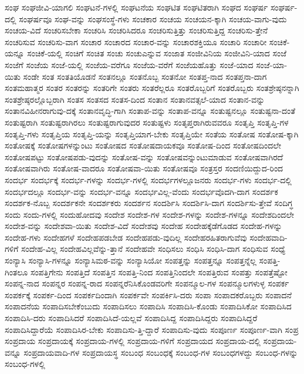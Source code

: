 {ಸಂಘ
ಸಂಘಜೀವಿ-ಯಾಗಲಿ
ಸಂಘಟನೆ-ಗಳಲ್ಲಿ
ಸಂಘಟನೆಯ
ಸಂಘಟಿತ
ಸಂಘಟಿತರಾಗಿ
ಸಂಘದ
ಸಂಘರ್ಷ
ಸಂಘರ್ಷ-ದಲ್ಲಿ
ಸಂಘರ್ಷವೂ
ಸಂಘ-ವನ್ನು
ಸಂಘಸಂಸ್ಥೆ-ಗಳು
ಸಂಚಕಾರ
ಸಂಚಯ
ಸಂಚಯನ-ಕ್ಕಾಗಿ
ಸಂಚಯ-ವಾಗು-ವುದು
ಸಂಚಯ-ವಿದೆ
ಸಂಚರಿಸಬೇಕಾ
ಸಂಚರಿಸಿ
ಸಂಚರಿಸಿದರೂ
ಸಂಚರಿಸುತ್ತಿತ್ತು
ಸಂಚರಿಸುತ್ತಿದ್ದ
ಸಂಚರಿಸು-ತ್ತೇನೆ
ಸಂಚರಿಸುವ
ಸಂಚರಿಸು-ವಾಗ
ಸಂಚಾರ
ಸಂಚಾರದ
ಸಂಚಾರ-ವನ್ನು
ಸಂಚಾರಶಕ್ತಿಯೂ
ಸಂಚಾರಿ
ಸಂಚಾರೀ
ಸಂಚಿಕೆ-ಯನ್ನೂ
ಸಂಚಿಕೆ-ಯಲ್ಲಿ
ಸಂಚಿಗೆ
ಸಂಚಿತ
ಸಂಚು
ಸಂಚುಎನ್ನುವ
ಸಂಜಾತ
ಸಂಜೀವಿನಿಯ
ಸಂಜೀವಿನಿ-ಯಾದ
ಸಂಜೆ
ಸಂಜೆಗೆ
ಸಂಜೆಯ
ಸಂಜೆ-ಯಲ್ಲಿ
ಸಂಜೆಯ-ವರೆಗೂ
ಸಂಜೆಯ-ವರೆಗೆ
ಸಂಜೆಯಹೊತ್ತು
ಸಂಜೆ-ಯಾದ
ಸಂಜೆ-ಯಾ-ಯಿತು
ಸಂಡೇ
ಸಂತ
ಸಂತತಿಯೊಡನೆ
ಸಂತನಲ್ಲೂ
ಸಂತನೊಬ್ಬ
ಸಂತನೋ
ಸಂತಪ್ತ-ನಾದ
ಸಂತಪ್ತನಾ-ದಾಗ
ಸಂತಮಹಾತ್ಮರ
ಸಂತರ
ಸಂತರನ್ನು
ಸಂತರಿಗೇ
ಸಂತರು
ಸಂತರೆಲ್ಲರೂ
ಸಂತರೊಬ್ಬರಿಗೆ
ಸಂತರೊಬ್ಬರು
ಸಂತಶ್ರೇಷ್ಠನನ್ನಾಗಿ
ಸಂತಶ್ರೇಷ್ಠರಲ್ಲೊಬ್ಬರಾಗಿ
ಸಂತಸ
ಸಂತಸದ
ಸಂತಸ-ದಿಂದ
ಸಂತಾನ
ಸಂತಾನವತ್ಸಲೆ-ಯಾದ
ಸಂತಾನ-ವನ್ನು
ಸಂತಾನವಿಹೀನರಾಗುವು-ದಕ್ಕೆ
ಸಂತಾನವೃದ್ಧಿ-ಗಾಗಿ
ಸಂತಾಪ-ವನ್ನು
ಸಂತಾಪ-ವನ್ನೂ
ಸಂತುಷ್ಟನಲ್ಲೂ
ಸಂತುಷ್ಟನಾ-ದಂತೆ
ಸಂತುಷ್ಟರಾಗಿ
ಸಂತುಷ್ಟರಾಗಿರಲು
ಸಂತುಷ್ಟರಾಗುವುದರ
ಸಂತುಷ್ಟಳು
ಸಂತೃಪ್ತರಾಗಿರುವವರೂ
ಸಂತೃಪ್ತಿ
ಸಂತೃಪ್ತಿ-ಗಳ
ಸಂತೃಪ್ತಿ-ಗಳು
ಸಂತೃಪ್ತಿಯ
ಸಂತೃಪ್ತಿ-ಯನ್ನು
ಸಂತೃಪ್ತಿಯಾಗ-ಬೇಕು
ಸಂತೃಪ್ತಿಯೇ
ಸಂತೆಯ
ಸಂತೋಷ
ಸಂತೋಷ-ಕ್ಕಾಗಿ
ಸಂತೋಷಕ್ಕೆ
ಸಂತೋಷಗಳನ್ನುಂಟು
ಸಂತೋಷದ
ಸಂತೋಷದಾಯಕವೂ
ಸಂತೋಷ-ದಿಂದ
ಸಂತೋಷದಿಂದಲೇ
ಸಂತೋಷಪಟ್ಟು
ಸಂತೋಷಪಡು-ವುದನ್ನು
ಸಂತೋಷ-ವನ್ನು
ಸಂತೋಷವನ್ನುಂಟುಮಾಡುವ
ಸಂತೋಷವಾಗಿರದೆ
ಸಂತೋಷವಾಗಿರು
ಸಂತೋಷ-ವಾದರೂ
ಸಂತೋಷವಾ-ಯಿತು
ಸಂತೋಷವೂ
ಸಂತ್ರಸ್ತರ
ಸಂದಣಿಯಿದ್ದುದ-ರಿಂದ
ಸಂದರ್ಭ
ಸಂದರ್ಭಕ್ಕೆ
ಸಂದರ್ಭ-ಗಳನ್ನು
ಸಂದರ್ಭ-ಗಳಲ್ಲಿ
ಸಂದರ್ಭಗಳಲ್ಲೂಜನರು
ಸಂದರ್ಭ-ಗಳು
ಸಂದರ್ಭ-ದಲ್ಲಿ
ಸಂದರ್ಭದಲ್ಲೂ
ಸಂದರ್ಭ-ವನ್ನು
ಸಂದರ್ಭ-ವನ್ನೂ
ಸಂದರ್ಭವಿಲ್ಲ-ವೆಂದು
ಸಂದರ್ಭವೊದಗಿ-ದಾಗ
ಸಂದರ್ಶಕ
ಸಂದರ್ಶಕ-ನೊಬ್ಬ
ಸಂದರ್ಶಕನೇ
ಸಂದರ್ಶಕರು
ಸಂದರ್ಶನ
ಸಂದರ್ಶಿಸಿ
ಸಂದರ್ಶಿಸಿ-ದಾಗ
ಸಂದರ್ಶಿಸು-ತ್ತೇವೆ
ಸಂದಿಗ್ಧ
ಸಂದು
ಸಂದು-ಗಳಲ್ಲಿ
ಸಂದುಹೋದವು
ಸಂದೇಶ
ಸಂದೇಶ-ಗಳ
ಸಂದೇಶ-ಗಳನ್ನು
ಸಂದೇಶ-ಗಳನ್ನೂ
ಸಂದೇಶದಿಂದಲೇ
ಸಂದೇಶ-ವನ್ನು
ಸಂದೇಶವಾ-ಯಿತು
ಸಂದೇಶ-ವಿದೆ
ಸಂದೇಶವು
ಸಂದೇಹ
ಸಂದೇಹಕ್ಕೆಡೆಗೊಡದ
ಸಂದೇಹ-ಗಳನ್ನು
ಸಂದೇಹ-ಗಳು
ಸಂದೇಹಗಳೆ
ಸಂದೇಹಪಡಬೇಡ
ಸಂದೇಹಪಡು-ವುದಿಲ್ಲ
ಸಂದೇಹರಹಿತರಾಗುವೆವು
ಸಂದೇಹವಾದಿ-ಗಳಿಗೆ
ಸಂದೇಹ-ವಿಲ್ಲ
ಸಂದೇಹವಿಲ್ಲವೆನ್ನು-ತ್ತಾನೆ
ಸಂದೇಹವೇ
ಸಂಧಿಸಲು
ಸಂಧಿಸಿ
ಸಂಧಿಸಿ-ದಾಗ
ಸಂಧಿಸುವ
ಸಂಧ್ಯೆ
ಸಂನ್ಯಾಸಿ
ಸಂನ್ಯಾಸಿ-ಗಳನ್ನೂ
ಸಂನ್ಯಾಸಿಮಠ-ವನ್ನು
ಸಂನ್ಯಾಸಿಯೋ
ಸಂಪತ್ತನ್ನು
ಸಂಪತ್ತನ್ನೂ
ಸಂಪತ್ತನ್ನೆಲ್ಲ
ಸಂಪತ್ತಿ-ಗಿಂತಲೂ
ಸಂಪತ್ತಿಗೇನು
ಸಂಪತ್ತಿದೆ
ಸಂಪತ್ತಿನ
ಸಂಪತ್ತಿ-ನಿಂದ
ಸಂಪತ್ತಿನಿಂದಲೇ
ಸಂಪತ್ತಿರುವ
ಸಂಪತ್ತು
ಸಂಪತ್ತೆಷ್ಟೋ
ಸಂಪನ್ನ-ನಾದ
ಸಂಪನ್ನರ
ಸಂಪನ್ನ-ರಾದ
ಸಂಪನ್ನರೆನಿಸಿಕೊಂಡವರಿಗೇ
ಸಂಪನ್ಮೂಲ-ಗಳ
ಸಂಪನ್ಮೂಲಗಳುಳ್ಳ
ಸಂಪರ್ಕ
ಸಂಪರ್ಕಕ್ಕೆ
ಸಂಪರ್ಕ-ದಿಂದ
ಸಂಪರ್ಕದಿಂದಾಗಿ
ಸಂಪರ್ಕವೇ
ಸಂಪರ್ಕಿಸಿ-ದರು
ಸಂಪಾ
ಸಂಪಾದಕರೊಬ್ಬರು
ಸಂಪಾದನೆ
ಸಂಪಾದನೆಯ
ಸಂಪಾದಿಸಬೇಕೆಂಬುದು
ಸಂಪಾದಿಸಲು
ಸಂಪಾದಿಸಿ
ಸಂಪಾದಿಸಿ-ಕೊಂಡು
ಸಂಪಾದಿಸಿಕೋ
ಸಂಪಾದಿಸಿದ
ಸಂಪಾದಿಸಿ-ದರು
ಸಂಪಾದಿಸಿದರೆ
ಸಂಪಾದಿಸಿದೆ-ಯಲ್ಲವೆ
ಸಂಪಾದಿಸಿದ್ದ
ಸಂಪಾದಿಸಿದ್ದರು
ಸಂಪಾದಿಸಿದ್ದರೆ
ಸಂಪಾದಿಸಿದ್ದಾರೆಯೆ
ಸಂಪಾದಿಸಿರ-ಬೇಕು
ಸಂಪಾದಿಸು-ತ್ತಿ-ದ್ದಾರೆ
ಸಂಪಾದಿಸು-ವುದು
ಸಂಪೂರ್ಣ
ಸಂಪೂರ್ಣ-ವಾಗಿ
ಸಂಪ್ರ
ಸಂಪ್ರದಾಯ
ಸಂಪ್ರದಾಯಕ್ಕೆ
ಸಂಪ್ರದಾಯ-ಗಳಲ್ಲಿ
ಸಂಪ್ರದಾಯ-ಗಳಿಗೆ
ಸಂಪ್ರದಾಯದ
ಸಂಪ್ರದಾಯ-ದಲ್ಲಿ
ಸಂಪ್ರದಾಯ-ವನ್ನೂ
ಸಂಪ್ರದಾಯವಾದಿ-ಗಳ
ಸಂಪ್ರದಾಯಸ್ಥ
ಸಂಬಂಧ
ಸಂಬಂಧಕ್ಕೆ
ಸಂಬಂಧ-ಗಳ
ಸಂಬಂಧಗಳದ್ದು
ಸಂಬಂಧ-ಗಳನ್ನು
ಸಂಬಂಧ-ಗಳಲ್ಲಿ
}
